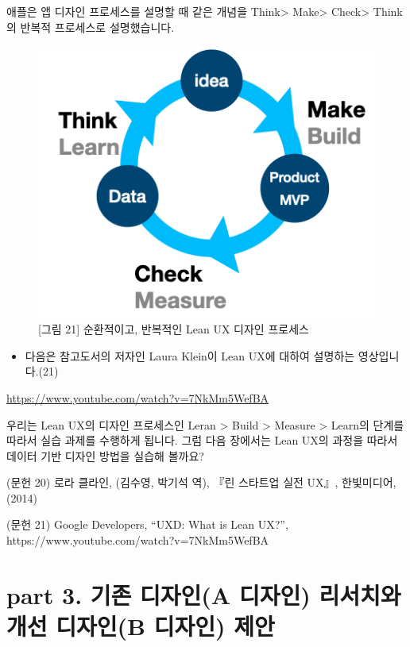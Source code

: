 \documentclass[
  letterpaper,
]{book}
\providecommand{\tightlist}{%
  \setlength{\itemsep}{0pt}\setlength{\parskip}{0pt}}\usepackage{longtable,booktabs,array}
\begin{document}
애플은 앱 디자인 프로세스를 설명할 때 같은 개념을 Think\textgreater{}
Make\textgreater{} Check\textgreater{} Think의 반복적 프로세스로
설명했습니다.

\begin{figure}[H]

{\centering \includegraphics{img/fig21.png}

}

\caption{{[}그림 21{]} 순환적이고, 반복적인 Lean UX 디자인 프로세스}

\end{figure}%

\begin{itemize}
\tightlist
\item
  다음은 참고도서의 저자인 Laura Klein이 Lean UX에 대하여 설명하는
  영상입니다.(21)
\end{itemize}

\url{https://www.youtube.com/watch?v=7NkMm5WefBA}

우리는 Lean UX의 디자인 프로세스인 Leran \textgreater{} Build
\textgreater{} Measure \textgreater{} Learn의 단계를 따라서 실습 과제를
수행하게 됩니다. 그럼 다음 장에서는 Lean UX의 과정을 따라서 데이터 기반
디자인 방법을 실습해 볼까요?

(문헌 20) 로라 클라인, (김수영, 박기석 역), 『린 스타트업 실전 UX』,
한빛미디어,(2014)

(문헌 21) Google Developers, ``UXD: What is Lean UX?'',
https://www.youtube.com/watch?v=7NkMm5WefBA

\part{\textbf{part 3. 기존 디자인(A 디자인) 리서치와 개선 디자인(B
디자인) 제안}}
\end{document}
